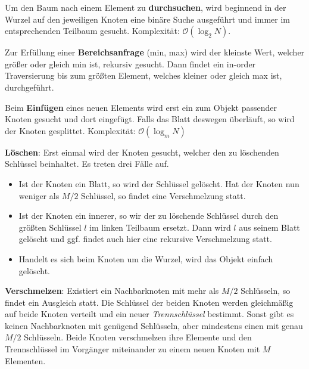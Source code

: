 \documentclass[a4paper,parskip=half*,DIV=15,fontsize=11pt]{scrartcl}
\begin{document}

Um den Baum nach einem Element zu \textbf{durchsuchen}, wird beginnend in der Wurzel auf den jeweiligen Knoten eine binäre Suche ausgeführt und immer im entsprechenden Teilbaum gesucht. Komplexität: $\mathcal{O}(\log_2N)$.

Zur Erfüllung einer \textbf{Bereichsanfrage} (min, max) wird der kleinste Wert, welcher größer oder gleich min ist, rekursiv gesucht. Dann findet ein in-order Traversierung bis zum größten Element, welches kleiner oder gleich max ist, durchgeführt.

Beim \textbf{Einfügen} eines neuen Elements wird erst ein zum Objekt passender Knoten gesucht und dort eingefügt. Falls das Blatt deswegen überläuft, so wird der Knoten gesplittet. Komplexität: $\mathcal{O}(\log_mN)$

\textbf{Löschen}:
Erst einmal wird der Knoten gesucht, welcher den zu löschenden Schlüssel beinhaltet. Es treten drei Fälle auf.
\begin{itemize}
\item Ist der Knoten ein Blatt, so wird der Schlüssel gelöscht. Hat der Knoten nun weniger als $M/2$ Schlüssel, so findet eine Verschmelzung statt.
\item Ist der Knoten ein innerer, so wir der zu löschende Schlüssel durch den größten Schlüssel $l$ im linken Teilbaum ersetzt. Dann wird $l$ aus seinem Blatt gelöscht und ggf. findet auch hier eine rekursive Verschmelzung statt.
\item Handelt es sich beim Knoten um die Wurzel, wird das Objekt einfach gelöscht.
\end{itemize}

\textbf{Verschmelzen}:
Existiert ein Nachbarknoten mit mehr als $M/2$ Schlüsseln, so findet ein Ausgleich statt. Die Schlüssel der beiden Knoten werden gleichmäßig auf beide Knoten verteilt und ein neuer \textit{Trennschlüssel} bestimmt. Sonst gibt es keinen Nachbarknoten mit genügend Schlüsseln, aber mindestens einen mit genau $M/2$ Schlüsseln. Beide Knoten verschmelzen ihre Elemente und den Trennschlüssel im Vorgänger miteinander zu einem neuen Knoten mit $M$ Elementen.
\end{document}
